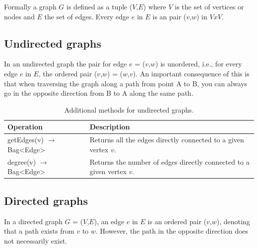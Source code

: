 Formally a graph $G$ is defined as a tuple ($V$,$E$) where $V$ is the set of vertices or nodes and $E$ the set of edges. Every edge $e$ in $E$ is an pair ($v$,$w$) in $V x V$.


\subsection{Undirected graphs}

In an undirected graph the pair for edge $e$ = ($v$,$w$) is unordered, i.e., for every edge $e$ in $E$, the ordered pair ($v$,$w$) = ($w$,$v$). An important consequence of this is that when traversing the graph along a path from point A to B, you can always go in the opposite direction from B to A along the same path.

\begin{table}[H]
	\caption{Additional methods for undirected graphs.}
	\label{tab:api:graph-undirected}
	\begin{tabular}{p{150px} | p{250px}}
		\textbf{Operation} & \textbf{Description} \\
		\hline
		getEdges(v) $\rightarrow$ Bag<Edge> & Returns all the edges directly connected to a given vertex $v$. \\
		degree(v) $\rightarrow$ Bag<Edge> & Returns the number of edges directly connected to a given vertex $v$. \\
		\hline
	\end{tabular}
\end{table}



\subsection{Directed graphs}

In a directed graph $G$ = ($V$,$E$), an edge $e$ in $E$ is an ordered pair ($v$,$w$), denoting that a path exists from $v$ to $w$. However, the path in the opposite direction does not necessarily exist.








